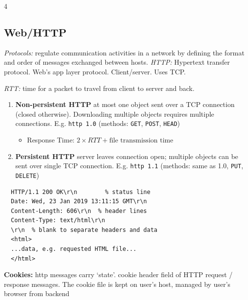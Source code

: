 \documentclass[10pt]{extarticle}
\begin{document}
\begin{multicols}{4}
  \subsection{Web/HTTP}
  \textit{Protocols: } regulate communication activities in a network by defining the format and order of messages exchanged between hosts.
  \textit{HTTP: }Hypertext transfer protocol. Web's app layer protocol. Client/server. Uses TCP.

  \textit{RTT: }time for a packet to travel from client to server and back.
  \begin{enumerate}
    \item \textbf{Non-persistent HTTP} at most one object sent over a TCP connection (closed otherwise). Downloading multiple objects requires multiple connections. E.g. \texttt{http 1.0} (methods: \texttt{GET}, \texttt{POST}, \texttt{HEAD})
      \begin{itemize}
        \item Response Time: $2 \times RTT+ \text{file transmission time}$
      \end{itemize}
    \item \textbf{Persistent HTTP} server leaves connection open; multiple objects can be sent over single TCP connection. E.g. \texttt{http 1.1} (methods: same as 1.0, \texttt{PUT}, \texttt{DELETE})
  \end{enumerate}

  \begin{verbatim}
  HTTP/1.1 200 OK\r\n        % status line
  Date: Wed, 23 Jan 2019 13:11:15 GMT\r\n
  Content-Length: 606\r\n  % header lines
  Content-Type: text/html\r\n
  \r\n  % blank to separate headers and data
  <html>
  ...data, e.g. requested HTML file...
  </html>
  \end{verbatim}

  \textbf{Cookies: } http messages carry `state'. cookie header field of HTTP request / response messages. The cookie file is kept on user’s host, managed by user’s browser from backend


\end{multicols}
\end{document}
